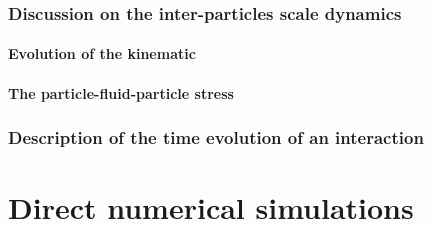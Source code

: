 \documentclass[12pt,a4paper,openany]{My_book}
\begin{document}
{\section{Discussion on the inter-particles scale dynamics}
\subsection{Evolution of the kinematic}
\subsection{The particle-fluid-particle stress}
\section{Description of the time evolution of an interaction}
}

\part{Direct numerical simulations}






\end{document}

